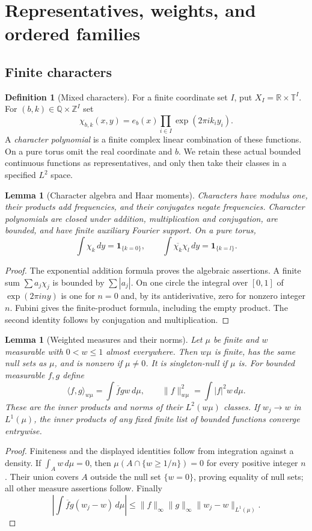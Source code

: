 \documentclass[reqno,a4paper,12pt]{amsart}
\newtheorem{lemma}[theorem]{Lemma}
\theoremstyle{definition}
\newtheorem{definition}[theorem]{Definition}
\newcommand{\R}{\mathbb R}
\newcommand{\Q}{\mathbb Q}
\newcommand{\Z}{\mathbb Z}
\newcommand{\T}{\mathbb T}
\newcommand{\ip}[2]{\langle #1,#2\rangle}
\begin{document}
\section{Representatives, weights, and ordered families}
\subsection{Finite characters}
\begin{definition}[Mixed characters]\label{def:characters}
For a finite coordinate set $I$, put $X_I=\R\times\T^I$.
For $(b,k)\in\Q\times\Z^I$ set
\[
 \chi_{b,k}(x,y)=e_b(x)\prod_{i\in I}\exp(2\pi i k_i y_i).
\]
A \emph{character polynomial} is a finite complex linear combination
of these functions. On a pure torus omit the real coordinate and $b$.
We retain these actual bounded continuous functions as representatives,
and only then take their classes in a specified $L^2$ space.
\end{definition}

\begin{lemma}[Character algebra and Haar moments]\label{lem:character-algebra}
Characters have modulus one, their products add frequencies, and their
conjugates negate frequencies. Character polynomials are closed under
addition, multiplication and conjugation, are bounded, and have finite
auxiliary Fourier support. On a pure torus,
\[
 \int\chi_k\,dy=\mathbf1_{\{k=0\}},\qquad
 \int\overline{\chi_k}\chi_l\,dy=\mathbf1_{\{k=l\}}.
\]
\end{lemma}
\begin{proof}
The exponential addition formula proves the algebraic assertions.
A finite sum $\sum a_j\chi_j$ is bounded by $\sum|a_j|$.
On one circle the integral over $[0,1]$ of $\exp(2\pi iny)$ is one
for $n=0$ and, by its antiderivative, zero for nonzero integer $n$.
Fubini gives the finite-product formula, including the empty product.
The second identity follows by conjugation and multiplication.
\end{proof}

\begin{lemma}[Weighted measures and their norms]\label{lem:weighted-measures}
Let $\mu$ be finite and $w$ measurable with $0<w\le1$ almost everywhere.
Then $w\mu$ is finite, has the same null sets as $\mu$, and is nonzero
if $\mu\ne0$. It is singleton-null if $\mu$ is. For bounded measurable
$f,g$ define
\[
 \ip{f}{g}_{w\mu}=\int\overline f g w\,d\mu,\qquad
 \|f\|_{w\mu}^2=\int |f|^2w\,d\mu.
\]
These are the inner products and norms of their $L^2(w\mu)$ classes.
If $w_j\to w$ in $L^1(\mu)$, the inner products of any fixed finite
list of bounded functions converge entrywise.
\end{lemma}
\begin{proof}
Finiteness and the displayed identities follow from integration against
a density. If $\int_Aw\,d\mu=0$, then
$\mu(A\cap\{w\ge1/n\})=0$ for every positive integer $n$.
Their union covers $A$ outside the null set $\{w=0\}$, proving equality
of null sets; all other measure assertions follow.
Finally
\[
 \left|\int\overline f g(w_j-w)\,d\mu\right|
 \le\|f\|_\infty\|g\|_\infty\|w_j-w\|_{L^1(\mu)}.
\]
\end{proof}
\end{document}
